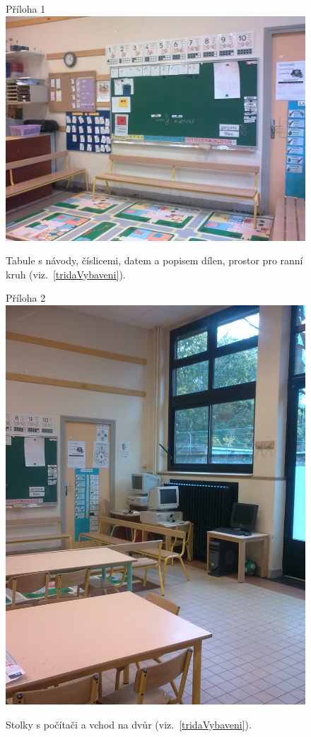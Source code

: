 	\begin{figure}[tb]
		\centering
		Příloha 1\\
		\includegraphics[height = 0.35\textheight]{./fotky/Obr1.jpg}
		\caption{
			Tabule s návody, číslicemi, datem a popisem dílen, prostor pro ranní kruh (viz.~\ref{tridaVybaveni}).
		}
		\label{Obr1}
	\end{figure}

	\begin{figure}[tb]
		\centering
		Příloha 2\\
		\includegraphics[height = 0.35\textheight]{./fotky/Obr2.jpg}
		\caption{
			Stolky s počítači a vchod na dvůr (viz.~\ref{tridaVybaveni}).
		}
		\label{Obr2}
	\end{figure}


